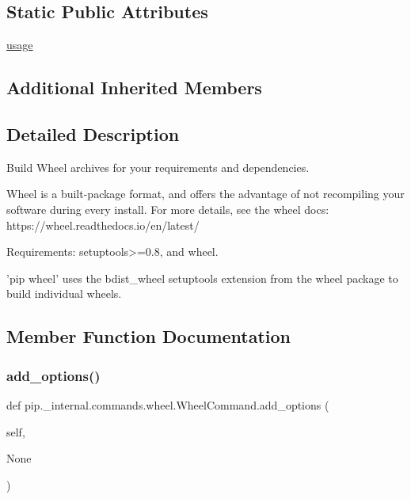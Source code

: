 \subsection*{Static Public Attributes}
\begin{DoxyCompactItemize}
\item 
\hyperlink{classpip_1_1__internal_1_1commands_1_1wheel_1_1WheelCommand_a4dff3ea0c3e37e621ae37b805556c3b5}{usage}
\end{DoxyCompactItemize}
\subsection*{Additional Inherited Members}


\subsection{Detailed Description}
\begin{DoxyVerb}Build Wheel archives for your requirements and dependencies.

Wheel is a built-package format, and offers the advantage of not
recompiling your software during every install. For more details, see the
wheel docs: https://wheel.readthedocs.io/en/latest/

Requirements: setuptools>=0.8, and wheel.

'pip wheel' uses the bdist_wheel setuptools extension from the wheel
package to build individual wheels.\end{DoxyVerb}
 

\subsection{Member Function Documentation}
\mbox{\label{classpip_1_1__internal_1_1commands_1_1wheel_1_1WheelCommand_a04be79614f64a032f237dc02f4750021}} 
\subsubsection{\texorpdfstring{add\+\_\+options()}{add\_options()}}
{\footnotesize\ttfamily def pip.\+\_\+internal.\+commands.\+wheel.\+Wheel\+Command.\+add\+\_\+options (\begin{DoxyParamCaption}\item[{}]{self,  }\item[{}]{None }\end{DoxyParamCaption})}


